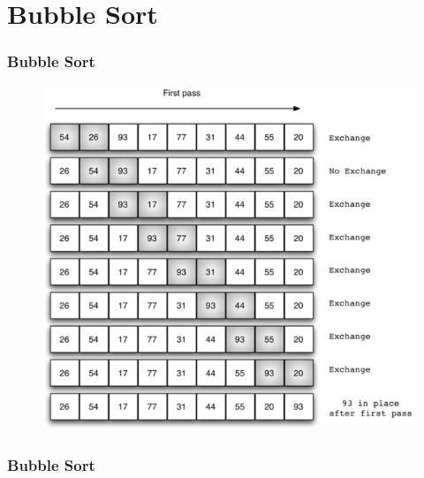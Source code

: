 \documentclass{beamer}
\begin{document}
\section{Bubble Sort}
\begin{frame}
    \frametitle{Bubble Sort}
    \begin{figure}[h]
        \includegraphics[scale=0.9]{bubble/bubble}
    \end{figure}
\end{frame}
\begin{frame}
    \frametitle{Bubble Sort}
    \begin{algorithm}[H]
        
    \end{algorithm}
\end{frame}
\end{document}
